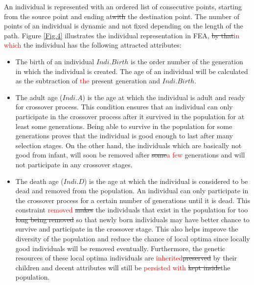 \documentclass[final]{elsarticle}
\begin{document}
An individual is represented with an ordered list of consecutive points, starting from the source point and ending at\sout{with} the destination point. The number of points of an individual is dynamic and not fixed depending on the length of the path. Figure \ref{Fig.4} illustrates the individual representation in FEA, \sout{by that}\textcolor{red}{in which} the individual has the following attracted attributes: \\
\begin{itemize}
	\item The birth of an individual $Indi.Birth$ is the order number of the generation in which the individual is created. The age of an individual will be calculated as the subtraction of \textcolor{red}{the} present generation and $Indi.Birth$.
	\item The adult age ($Indi.A$) is the age at which the individual is adult and ready for crossover process. This condition ensures that an individual can only participate in the crossover process after it survived in the population for at least some generations. Being able to survive in the population for some generations proves that the individual is good enough to last after many selection stages. On the other hand, the individuals which are basically not good from infant, will soon be removed after \sout{some}\textcolor{red}{a few} generations and will not participate in any crossover stages.
	\item The death age ($Indi.D$) is the age at which the individual is considered to be dead and removed from the population. An individual can only participate in the crossover process for a certain number of generations until it is dead. This constraint \textcolor{red}{removed} \sout{makes} the individuals that exist in the population for too \sout{long being removed} so that newly born individuals may have better chance to survive and participate in the crossover stage. This also helps improve the diversity of the population and reduce the chance of local optima since locally good individuals will be removed eventually. Furthermore, the genetic resources of these local optima individuals are \textcolor{red}{inherited}\sout{preserved} by their children and decent attributes will still be \textcolor{red}{persisted with }\sout{kept inside}the population.
\end{itemize}
\end{document}
